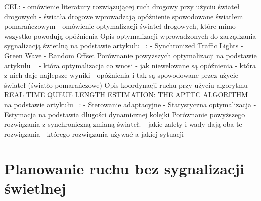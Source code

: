 CEL:
\newline
- omówienie literatury rozwiązującej ruch drogowy przy użyciu świateł drogowych
\newline
- światła drogowe wprowadzają opóźnienie spowodowane światłem pomarańczowym
\newline
- omówienie optymalizacji świateł drogowych, które mimo wszystko powodują opóźnienia
\newline
\newline
Opis optymalizacji wprowadzonych do zarządzania sygnalizacją świetlną na podstawie artykułu ~\cite{brockfeld2001optimizing}:
  \newline
  - Synchronized Traffic Lights
  \newline
  - Green Wave
  \newline
  - Random Offset
\newline
\newline
Porównanie powyższych optymalizacji na podstawie artykułu ~\cite{brockfeld2001optimizing}
\newline
- która optymalizacja co wnosi
\newline
- jak niewelowane są opóźnienia
\newline
- która z nich daje najlepsze wyniki
\newline
- opóźnienia i tak są spowodowane przez użycie świateł (światło pomarańczowe)
\newline
\newline
Opis koordynacji ruchu przy użyciu algorytmu REAL TIME QUEUE LENGTH ESTIMATION: THE APTTC ALGORITHM na podstawie artykułu ~\cite{athmaraman2005adaptive}:
  \newline
  - Sterowanie adaptacyjne
  \newline
  - Statystyczna optymalizacja
  \newline
  - Estymacja na podstawia długości dynamicznej kolejki
  \newline
\newline
Porównanie powyższego rozwiązania z synchroniczną zmianą świateł.
\newline
- jakie zalety i wady dają oba te rozwiązania
\newline
- którego rozwiązania używać a jakiej sytuacji
\newline
\newline

\section{Planowanie ruchu bez sygnalizacji świetlnej}


